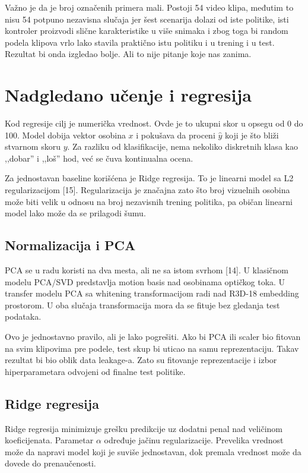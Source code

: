 ﻿\documentclass[12pt,a4paper]{report}
\begin{document}
Važno je da je broj označenih primera mali. Postoji 54 video klipa, međutim
to nisu 54 potpuno nezavisna slučaja jer šest scenarija dolazi od iste politike,
isti kontroler proizvodi slične karakteristike u više snimaka i zbog toga bi
random podela klipova vrlo lako stavila praktično istu politiku i u trening i u
test. Rezultat bi onda izgledao bolje. Ali to nije pitanje koje nas zanima.

\section{Nadgledano učenje i regresija}

Kod regresije cilj je numerička vrednost. Ovde je to ukupni skor u opsegu od 0
do 100. Model dobija vektor osobina $x$ i pokušava da proceni $\hat{y}$ koji je
što bliži stvarnom skoru $y$. Za razliku od klasifikacije, nema nekoliko
diskretnih klasa kao ,,dobar'' i ,,loš'' hod, već se čuva kontinualna ocena.

Za jednostavan baseline korišćena je Ridge regresija. To je linearni model sa
L2 regularizacijom [15]. Regularizacija je značajna zato što broj vizuelnih osobina
može biti velik u odnosu na broj nezavisnih trening politika, pa običan linearni
model lako može da se prilagodi šumu.

\subsection{Normalizacija i PCA}

PCA se u radu koristi na dva mesta, ali ne sa istom svrhom [14]. U klasičnom modelu
PCA/SVD predstavlja motion basis nad osobinama optičkog toka. U transfer modelu
PCA sa whitening transformacijom radi nad R3D-18 embedding prostorom. U oba
slučaja transformacija mora da se fituje bez gledanja test podataka.

Ovo je jednostavno pravilo, ali je lako pogrešiti. Ako bi PCA ili scaler bio
fitovan na svim klipovima pre podele, test skup bi uticao na samu
reprezentaciju. Takav rezultat bi bio oblik data leakage-a. Zato su fitovanje
reprezentacije i izbor hiperparametara odvojeni od finalne test politike.

\subsection{Ridge regresija}

Ridge regresija minimizuje grešku predikcije uz dodatni penal nad veličinom
koeficijenata. Parametar $\alpha$ određuje jačinu regularizacije. Prevelika
vrednost može da napravi model koji je suviše jednostavan, dok premala vrednost
može da dovede do prenaučenosti.
\end{document}
